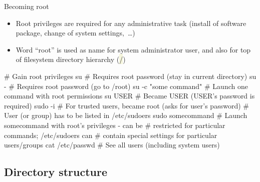 \documentclass[compress, xelatex, 11pt, xcolor=svgnames, aspectratio=169, url={hyphens, lowtilde}]{beamer}
\renewcommand{\texttt}[1]{\colorbox{Beige}{{\ttfamily #1}}}
\begin{document}
\begin{frame}[fragile]{Becoming root}
	\begin{itemize}
		\item Root privileges are required for any administrative task (install of software package, change of system settings,~\ldots)
		\item Word \enquote{root} is used as name for system administrator user, and also for top of filesystem directory hierarchy (\texttt{/})
	\end{itemize}
	\begin{bashcode}
    # Gain root privileges
    su # Requires root password (stay in current directory)
    su - # Requires root password (go to /root)
    su -c "some command" # Launch one command with root permissions
    su USER # Became USER (USER's password is required)
    sudo -i # For trusted users, became root (asks for user's password)
            # User (or group) has to be listed in /etc/sudoers
    sudo somecommand # Launch somecommand with root's privileges - can be
                     # restricted for particular commands; /etc/sudoers can
                     # contain special settings for particular users/groups
    cat /etc/passwd # See all users (including system users)
	\end{bashcode}
\end{frame}

\subsection{Directory structure}
\end{document}
